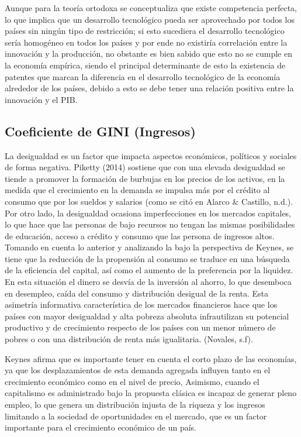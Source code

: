 \documentclass[11pt]{article}
\begin{document}
{Aunque para la teoría ortodoxa se conceptualiza que existe competencia perfecta, lo que implica que un desarrollo tecnológico pueda ser aprovechado por todos los países sin ningún tipo de restricción; si esto sucediera el desarrollo tecnológico sería homogéneo en todos los países y por ende no existiría correlación entre la innovación y la producción, no obstante es bien sabido que esto no se cumple en la economía empírica, siendo el principal determinante de esto la existencia de patentes que marcan la diferencia en el desarrollo tecnológico de la economía alrededor de los países, debido a esto se debe tener una relación positiva entre la innovación y el PIB.



\subsection{Coeficiente de GINI (Ingresos)}



La desigualdad es un factor que impacta aspectos económicos, políticos y sociales de forma negativa. Piketty (2014) sostiene que con una elevada desigualdad se tiende a promover la formación de burbujas en los precios de los activos, en la medida que el crecimiento en la demanda se impulsa más por el crédito al consumo que por los sueldos y salarios (como se citó en Alarco & Castillo, n.d.). Por otro lado, la desigualdad ocasiona  imperfecciones en los mercados capitales, lo que hace que las personas de bajo recursos no tengan las mismas posibilidades de educación, acceso a crédito y consumo que las persona de ingresos altos. Tomando en  cuenta lo anterior y analizando la bajo la perspectiva de Keynes, se tiene que la reducción de la propensión al consumo se traduce en una búsqueda de la eficiencia del capital, así como el aumento de la preferencia por la liquidez. En esta situación el dinero se desvía de la inversión al ahorro, lo que desemboca en desempleo, caída del consumo y distribución desigual de la renta. Esta asimetría informativa característica de los mercados financieros hace que los países con mayor desigualdad y alta pobreza absoluta infrautilizan su potencial productivo y de crecimiento respecto de los países con un menor número de pobres o con una distribución de renta más igualitaria. (Novales, s.f). 

Keynes afirma que es importante tener en cuenta el corto plazo de las economías, ya que los desplazamientos de esta demanda agregada influyen tanto en el crecimiento económico como en el nivel de precio, Asimismo, cuando el capitalismo es administrado bajo la propuesta clásica es incapaz de generar pleno empleo, lo que genera un distribución injusta de la riqueza y los ingresos limitando a la sociedad de oportunidades en el mercado, que es un factor importante para el crecimiento económico de un país. 



}
\end{document}
